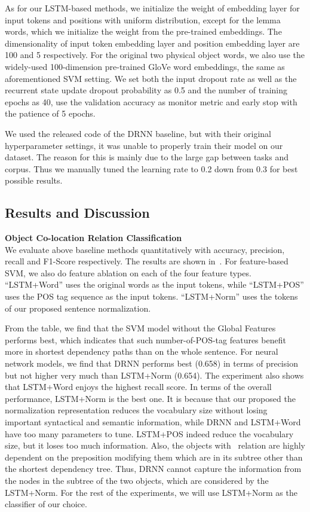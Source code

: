 As for our LSTM-based methods, we initialize the weight of embedding layer for input tokens and positions with uniform distribution, except for the lemma words, which we initialize the weight from the pre-trained embeddings. 
The dimensionality of input token embedding layer and position embedding layer are 100 and 5 respectively. 
For the original two physical object words, we also use the widely-used 100-dimension pre-trained GloVe word embeddings, the same as aforementioned SVM setting. 
We set both the input dropout rate as well as the recurrent state update dropout probability as 0.5 and the number of training epochs as 40, use the validation accuracy as monitor metric and early stop with the patience of 5 epochs.

We used the released code of the DRNN baseline, but with their original hyperparameter settings, it was unable to properly train their model on our dataset. The reason for this is mainly due to the large gap between tasks and corpus. Thus we manually tuned the learning rate to 0.2 down from 0.3 for best possible results.

\subsection{Results and Discussion}
\textbf{Object Co-location Relation Classification}\\
We evaluate above baseline methods  quantitatively with accuracy, precision, recall and F1-Score respectively.
The results are shown in~.
For feature-based SVM, we also do feature ablation on each of the four feature types. 
``LSTM+Word'' uses the original words as the input tokens, while ``LSTM+POS'' uses the POS tag sequence as the input tokens. ``LSTM+Norm'' uses the tokens of our proposed sentence normalization. 

From the table, we find that the SVM model without the Global Features performs best, which indicates that such number-of-POS-tag features benefit more in shortest dependency paths than on the whole sentence.
For neural network models, we find that DRNN performs best (0.658) in terms of precision but not higher very much than  LSTM+Norm (0.654). 
The experiment also shows that LSTM+Word enjoys the highest recall score.
In terms of the overall performance, LSTM+Norm is the best one. 
It is because that our proposed the normalization representation reduces the vocabulary size without losing important syntactical and semantic information, while DRNN and LSTM+Word have too many parameters to tune. LSTM+POS indeed reduce the vocabulary size, but it loses too much information. 
Also, the objects with \lnear\ relation are highly dependent on the preposition modifying them which are in its subtree other than the shortest dependency tree. 
Thus, DRNN cannot capture the information from the nodes in the subtree of the two objects, which are considered by the LSTM+Norm. For the rest of the
experiments, we will use LSTM+Norm as the classifier of our choice.

